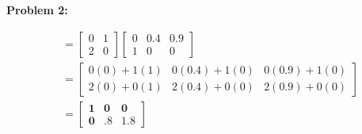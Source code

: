 \documentclass[11pt]{article}
\newenvironment{problem}[1]{\textbf{Problem #1: }}{\newpage}
\begin{document}
\begin{problem}{2}
\begin{enumerate}[label = (\alph*)]
\begin{align*}
				&= \begin{bmatrix} 0 & 1 \\ 2 & 0\end{bmatrix}\begin{bmatrix} 0 & 0.4 & 0.9 \\ 1 & 0 & 0	\end{bmatrix} \\
				&= \begin{bmatrix} 0(0) + 1(1) & 0(0.4) + 1(0) & 0(0.9) + 1(0) \\ 2(0) + 0(1) & 2(0.4) + 0(0) & 2(0.9) + 0(0) \end{bmatrix} \\
				&= \boldsymbol{\begin{bmatrix} 1 & 0 & 0 \\ 0 & .8 & 1.8\end{bmatrix} }
			\end{align*}
		\end{enumerate}
	\end{problem}
\end{document}

